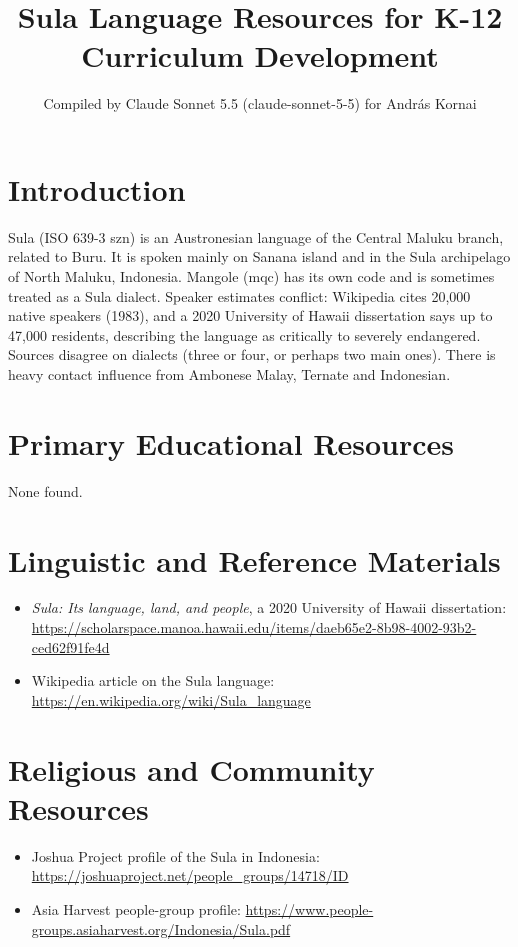 \documentclass[12pt]{article}
\title{Sula Language Resources for K-12 Curriculum Development}
\author{Compiled by Claude Sonnet 5.5 (claude-sonnet-5-5) for Andr\'as Kornai}
\date{}
\begin{document}
\maketitle

\section{Introduction}
Sula (ISO 639-3 szn) is an Austronesian language of the Central Maluku branch, related to Buru. It is spoken mainly on Sanana island and in the Sula archipelago of North Maluku, Indonesia. Mangole (mqc) has its own code and is sometimes treated as a Sula dialect. Speaker estimates conflict: Wikipedia cites 20,000 native speakers (1983), and a 2020 University of Hawai\textquotesingle i dissertation says up to 47,000 residents, describing the language as critically to severely endangered. Sources disagree on dialects (three or four, or perhaps two main ones). There is heavy contact influence from Ambonese Malay, Ternate and Indonesian.

\section{Primary Educational Resources}
None found.

\section{Linguistic and Reference Materials}
\begin{itemize}
\item \emph{Sula: Its language, land, and people}, a 2020 University of Hawai\textquotesingle i dissertation: \url{https://scholarspace.manoa.hawaii.edu/items/daeb65e2-8b98-4002-93b2-ced62f91fe4d}
\item Wikipedia article on the Sula language: \url{https://en.wikipedia.org/wiki/Sula_language}
\end{itemize}

\section{Religious and Community Resources}
\begin{itemize}
\item Joshua Project profile of the Sula in Indonesia: \url{https://joshuaproject.net/people_groups/14718/ID}
\item Asia Harvest people-group profile: \url{https://www.people-groups.asiaharvest.org/Indonesia/Sula.pdf}
\end{itemize}
\end{document}
